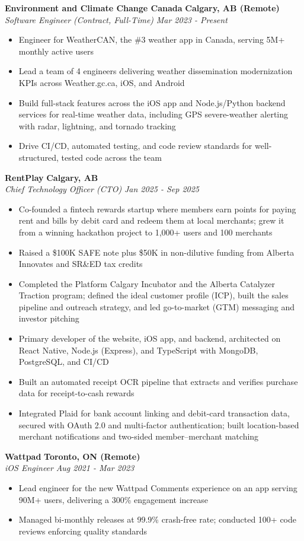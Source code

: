 \documentclass[letterpaper,11pt]{article}
\newcommand{\resumeSubheading}[4]{%
  \vspace{3pt}\item
  \textbf{#1} \hfill \textbf{\small #2}\\
  \textit{\small #3} \hfill \textit{\small #4}\vspace{-2pt}
}
\newcommand{\resumeItem}[1]{
  \item\small{
    {#1 \vspace{2pt}}
  }
}
\newcommand{\resumeItemListStart}{\begin{itemize}[leftmargin=0.15in]}
\newcommand{\resumeItemListEnd}{\end{itemize}\vspace{3pt}}
\begin{document}
\resumeSubheading
      {Environment and Climate Change Canada}{Calgary, AB (Remote)}
      {Software Engineer (Contract, Full-Time)}{Mar 2023 - Present}
      \resumeItemListStart
        \resumeItem{Engineer for WeatherCAN, the \#3 weather app in Canada, serving 5M+ monthly active users}
        \resumeItem{Lead a team of 4 engineers delivering weather dissemination modernization KPIs across Weather.gc.ca, iOS, and Android}
        \resumeItem{Build full-stack features across the iOS app and Node.js/Python backend services for real-time weather data, including GPS severe-weather alerting with radar, lightning, and tornado tracking}
        \resumeItem{Drive CI/CD, automated testing, and code review standards for well-structured, tested code across the team}
      \resumeItemListEnd

\resumeSubheading
      {RentPlay}{Calgary, AB}
      {Chief Technology Officer (CTO)}{Jan 2025 - Sep 2025}
      \resumeItemListStart
        \resumeItem{Co-founded a fintech rewards startup where members earn points for paying rent and bills by debit card and redeem them at local merchants; grew it from a winning hackathon project to 1,000+ users and 100 merchants}
        \resumeItem{Raised a \$100K SAFE note plus \$50K in non-dilutive funding from Alberta Innovates and SR\&ED tax credits}
        \resumeItem{Completed the Platform Calgary Incubator and the Alberta Catalyzer Traction program; defined the ideal customer profile (ICP), built the sales pipeline and outreach strategy, and led go-to-market (GTM) messaging and investor pitching}
        \resumeItem{Primary developer of the website, iOS app, and backend, architected on React Native, Node.js (Express), and TypeScript with MongoDB, PostgreSQL, and CI/CD}
        \resumeItem{Built an automated receipt OCR pipeline that extracts and verifies purchase data for receipt-to-cash rewards}
        \resumeItem{Integrated Plaid for bank account linking and debit-card transaction data, secured with OAuth 2.0 and multi-factor authentication; built location-based merchant notifications and two-sided member--merchant matching}
      \resumeItemListEnd

\newpage
\resumeSubheading
      {Wattpad}{Toronto, ON (Remote)}
      {iOS Engineer}{Aug 2021 - Mar 2023}
      \resumeItemListStart
        \resumeItem{Lead engineer for the new Wattpad Comments experience on an app serving 90M+ users, delivering a 300\% engagement increase}
        \resumeItem{Managed bi-monthly releases at 99.9\% crash-free rate; conducted 100+ code reviews enforcing quality standards}
      \resumeItemListEnd
\end{document}
